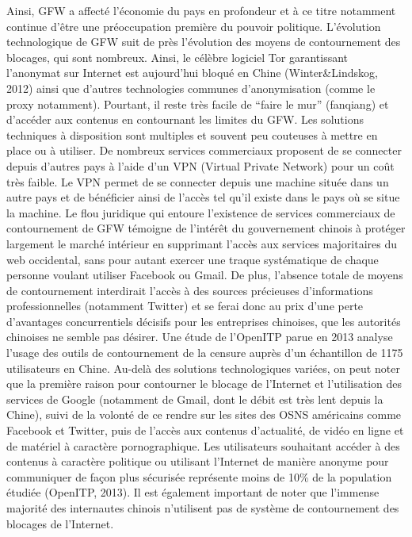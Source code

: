 {\color{black}
Ainsi, GFW a affect\'e l'\'economie du pays en profondeur et \`a ce titre notamment continue d'\^etre une
pr\'eoccupation premi\`ere du pouvoir politique. L'\'evolution technologique de GFW suit de pr\`es l'\'evolution des
moyens de contournement des blocages, qui sont nombreux. Ainsi, le c\'el\`ebre logiciel Tor garantissant l'anonymat sur
Internet est aujourd'hui bloqu\'e en Chine (Winter\&Lindskog, 2012) ainsi que d'autres technologies communes
d'anonymisation (comme le proxy notamment). Pourtant, il reste tr\`es facile de ``faire le mur'' (fanqiang) et
d'acc\'eder aux contenus en contournant les limites du GFW. Les solutions techniques \`a disposition sont multiples et
souvent peu couteuses \`a mettre en place ou \`a utiliser. De nombreux services commerciaux proposent de se connecter
depuis d'autres pays \`a l'aide d'un VPN (Virtual Private Network) pour un co\^ut tr\`es faible. Le VPN permet de se
connecter depuis une machine situ\'ee dans un autre pays et de b\'en\'eficier ainsi de l'acc\`es tel qu'il existe dans
le pays o\`u se situe la machine. Le flou juridique qui entoure l'existence de services commerciaux de contournement de
GFW t\'emoigne de l'int\'er\^et du gouvernement chinois \`a prot\'eger largement le march\'e int\'erieur en supprimant
l'acc\`es aux services majoritaires du web occidental, sans pour autant exercer une traque syst\'ematique de chaque
personne voulant utiliser Facebook ou Gmail. De plus, l'absence totale de moyens de contournement interdirait l'acc\`es
\`a des sources pr\'ecieuses d'informations professionnelles (notamment Twitter) et se ferai donc au prix d'une perte
d'avantages concurrentiels d\'ecisifs pour les entreprises chinoises, que les autorit\'es chinoises ne semble pas
d\'esirer. Une \'etude de l'OpenITP parue en 2013 analyse l'usage des outils de contournement de la censure aupr\`es
d'un \'echantillon de 1175 utilisateurs en Chine. Au-del\`a des solutions technologiques vari\'ees, on peut noter que
la premi\`ere raison pour contourner le blocage de l'Internet et l'utilisation des services de Google (notamment de
Gmail, dont le d\'ebit est tr\`es lent depuis la Chine), suivi de la volont\'e de ce rendre sur les sites des OSNS
am\'ericains comme Facebook et Twitter, puis de l'acc\`es aux contenus d'actualit\'e, de vid\'eo en ligne et de
mat\'eriel \`a caract\`ere pornographique. Les utilisateurs souhaitant acc\'eder \`a des contenus \`a caract\`ere
politique ou utilisant l'Internet de mani\`ere anonyme pour communiquer de fa\c{c}on plus s\'ecuris\'ee repr\'esente
moins de 10\% de la population \'etudi\'ee (OpenITP, 2013). Il est \'egalement important de noter que l'immense
majorit\'e des internautes chinois n'utilisent pas de syst\`eme de contournement des blocages de l'Internet. }

